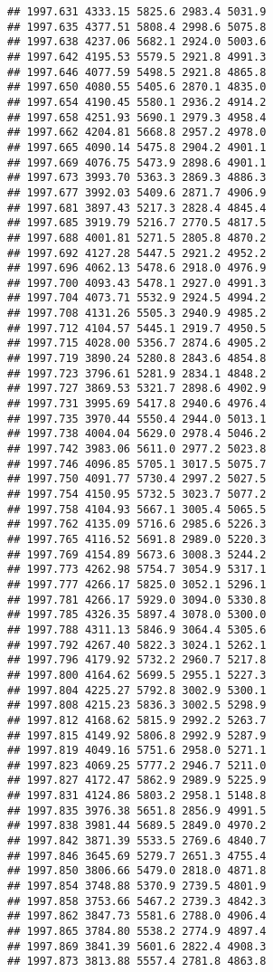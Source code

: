 \documentclass[
]{article}
\begin{document}
\begin{verbatim}
## 1997.631 4333.15 5825.6 2983.4 5031.9
## 1997.635 4377.51 5808.4 2998.6 5075.8
## 1997.638 4237.06 5682.1 2924.0 5003.6
## 1997.642 4195.53 5579.5 2921.8 4991.3
## 1997.646 4077.59 5498.5 2921.8 4865.8
## 1997.650 4080.55 5405.6 2870.1 4835.0
## 1997.654 4190.45 5580.1 2936.2 4914.2
## 1997.658 4251.93 5690.1 2979.3 4958.4
## 1997.662 4204.81 5668.8 2957.2 4978.0
## 1997.665 4090.14 5475.8 2904.2 4901.1
## 1997.669 4076.75 5473.9 2898.6 4901.1
## 1997.673 3993.70 5363.3 2869.3 4886.3
## 1997.677 3992.03 5409.6 2871.7 4906.9
## 1997.681 3897.43 5217.3 2828.4 4845.4
## 1997.685 3919.79 5216.7 2770.5 4817.5
## 1997.688 4001.81 5271.5 2805.8 4870.2
## 1997.692 4127.28 5447.5 2921.2 4952.2
## 1997.696 4062.13 5478.6 2918.0 4976.9
## 1997.700 4093.43 5478.1 2927.0 4991.3
## 1997.704 4073.71 5532.9 2924.5 4994.2
## 1997.708 4131.26 5505.3 2940.9 4985.2
## 1997.712 4104.57 5445.1 2919.7 4950.5
## 1997.715 4028.00 5356.7 2874.6 4905.2
## 1997.719 3890.24 5280.8 2843.6 4854.8
## 1997.723 3796.61 5281.9 2834.1 4848.2
## 1997.727 3869.53 5321.7 2898.6 4902.9
## 1997.731 3995.69 5417.8 2940.6 4976.4
## 1997.735 3970.44 5550.4 2944.0 5013.1
## 1997.738 4004.04 5629.0 2978.4 5046.2
## 1997.742 3983.06 5611.0 2977.2 5023.8
## 1997.746 4096.85 5705.1 3017.5 5075.7
## 1997.750 4091.77 5730.4 2997.2 5027.5
## 1997.754 4150.95 5732.5 3023.7 5077.2
## 1997.758 4104.93 5667.1 3005.4 5065.5
## 1997.762 4135.09 5716.6 2985.6 5226.3
## 1997.765 4116.52 5691.8 2989.0 5220.3
## 1997.769 4154.89 5673.6 3008.3 5244.2
## 1997.773 4262.98 5754.7 3054.9 5317.1
## 1997.777 4266.17 5825.0 3052.1 5296.1
## 1997.781 4266.17 5929.0 3094.0 5330.8
## 1997.785 4326.35 5897.4 3078.0 5300.0
## 1997.788 4311.13 5846.9 3064.4 5305.6
## 1997.792 4267.40 5822.3 3024.1 5262.1
## 1997.796 4179.92 5732.2 2960.7 5217.8
## 1997.800 4164.62 5699.5 2955.1 5227.3
## 1997.804 4225.27 5792.8 3002.9 5300.1
## 1997.808 4215.23 5836.3 3002.5 5298.9
## 1997.812 4168.62 5815.9 2992.2 5263.7
## 1997.815 4149.92 5806.8 2992.9 5287.9
## 1997.819 4049.16 5751.6 2958.0 5271.1
## 1997.823 4069.25 5777.2 2946.7 5211.0
## 1997.827 4172.47 5862.9 2989.9 5225.9
## 1997.831 4124.86 5803.2 2958.1 5148.8
## 1997.835 3976.38 5651.8 2856.9 4991.5
## 1997.838 3981.44 5689.5 2849.0 4970.2
## 1997.842 3871.39 5533.5 2769.6 4840.7
## 1997.846 3645.69 5279.7 2651.3 4755.4
## 1997.850 3806.66 5479.0 2818.0 4871.8
## 1997.854 3748.88 5370.9 2739.5 4801.9
## 1997.858 3753.66 5467.2 2739.3 4842.3
## 1997.862 3847.73 5581.6 2788.0 4906.4
## 1997.865 3784.80 5538.2 2774.9 4897.4
## 1997.869 3841.39 5601.6 2822.4 4908.3
## 1997.873 3813.88 5557.4 2781.8 4863.8

\end{verbatim}
\end{document}
